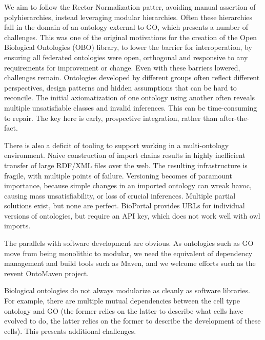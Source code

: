 \documentclass{llncs}
\begin{document}
We aim to follow the Rector Normalization patter, avoiding manual
assertion of polyhierarchies, instead leveraging modular
hierarchies. Often these hierarchies fall in the domain of an ontology
external to GO, which presents a number of challenges. This was one of
the original motivations for the creation of the Open Biological
Ontologies (OBO) library, to lower the barrier for interoperation, by
ensuring all federated ontologies were open, orthogonal and responsive
to any requirements for improvement or change. Even with these
barriers lowered, challenges remain. Ontologies developed by different
groups often reflect different perspectives, design patterns and
hidden assumptions that can be hard to reconcile. The initial
axiomatization of one ontology using another often reveals multiple
unsatisfiable classes and invalid inferences. This can be
time-consuming to repair. The key here is early, prospective
integration, rather than after-the-fact.

There is also a deficit of tooling to support working in a
multi-ontology environment. Naive construction of import chains
results in highly inefficient transfer of large RDF/XML files over the
web. The resulting infrastructure is fragile, with multiple points of
failure. Versioning becomes of paramount importance, because simple
changes in an imported ontology can wreak havoc, causing mass
unsatisfiability, or loss of crucial inferences. Multiple partial
solutions exist, but none are perfect. BioPortal provides URLs for
individual versions of ontologies, but require an API key, which does
not work well with owl imports.

The parallels with software development are obvious. As ontologies
such as GO move from being monolithic to modular, we need the
equivalent of dependency management and build tools such as Maven, and
we welcome efforts such as the revent OntoMaven
project\cite{paschke2013ontomaven}.

Biological ontologies do not always modularize as cleanly as software
libraries. For example, there are multiple mutual dependencies between
the cell type ontology and GO (the former relies on the latter to
describe what cells have evolved to do, the latter relies on the
former to describe the development of these cells). This presents
additional challenges.


\end{document}
